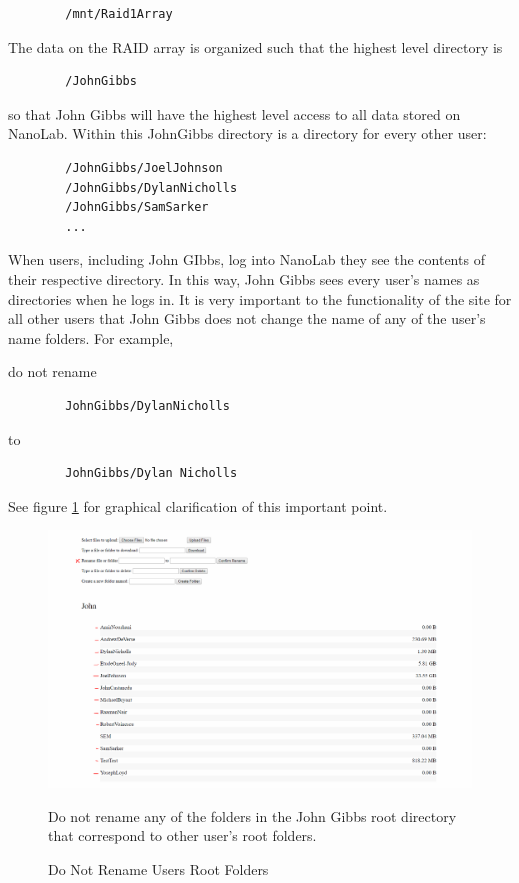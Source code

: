 \documentclass[titlepage]{article}
\begin{document}
    \begin{verbatim}
        /mnt/Raid1Array
    \end{verbatim}
    
    The data on the RAID array is organized such that the highest level directory is
    
    \begin{verbatim}
        /JohnGibbs
    \end{verbatim}
    
    so that John Gibbs will have the highest level access to all data stored on NanoLab. Within this JohnGibbs directory is a directory for every other user:
    
    \begin{verbatim}
        /JohnGibbs/JoelJohnson
        /JohnGibbs/DylanNicholls
        /JohnGibbs/SamSarker
        ...
    \end{verbatim}
    
    When users, including John GIbbs, log into NanoLab they see the contents of their respective directory. In this way, John Gibbs sees every user's names as directories when he logs in. It is very important to the functionality of the site for all other users that John Gibbs does not change the name of any of the user's name folders. For example,
    \\
    
    {\color{red}
    \noindent do not rename
    \begin{verbatim}
        JohnGibbs/DylanNicholls
    \end{verbatim}
    to 
    \begin{verbatim}
        JohnGibbs/Dylan Nicholls
    \end{verbatim}
    }
    \noindent See figure \ref{DoNotRename} for graphical clarification of this important point.
    \\
    
    \begin{figure}[t]
    \centering
    \includegraphics[width=125mm]{DoNotRename.png}
     \caption{Do Not Rename Users Root Folders}
     \medskip
     \small 
     Do not rename any of the folders in the John Gibbs root directory that correspond to other user's root folders.
     \label{DoNotRename}
    \end{figure}
    
\end{document}
